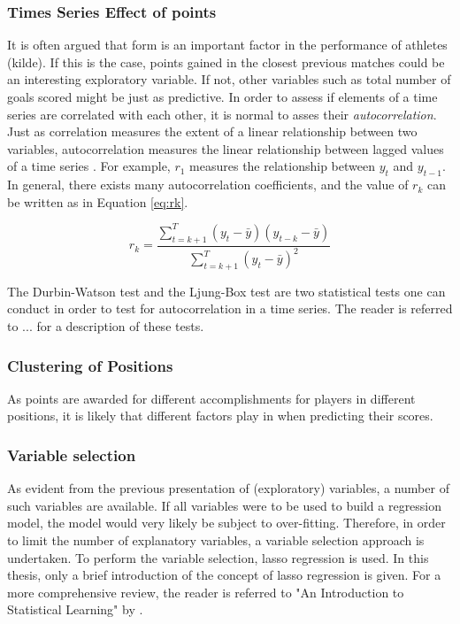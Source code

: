 \subsubsection{Times Series Effect of points}

It is often argued that form is an important factor in the performance of athletes (kilde). If this is the case, points gained in the closest previous matches could be an interesting exploratory variable. If not, other variables such as total number of goals scored might be just as predictive. In order to assess if elements of a time series are correlated with each other, it is normal to asses their \textit{autocorrelation}. Just as correlation measures the extent of a linear relationship between two variables, autocorrelation measures the linear relationship between lagged values of a time series \citep{Hyndman}. For example, $r_1$ measures the relationship between $y_t$ and $y_{t-1}$. In general, there exists many autocorrelation coefficients, and the value of $r_k$ can be written as in Equation \ref{eq:rk}. 


\begin{equation}\label{eq:rk}
    r_k = \frac{\sum_{t=k+1}^T(y_t-\bar{y})(y_{t-k}-\bar{y})}{\sum_{t=k+1}^T(y_t-\bar{y})^2}
\end{equation}

The Durbin-Watson test and the Ljung-Box test are two statistical tests one can conduct in order to test for autocorrelation in a time series. The reader is referred to ... for a description of these tests.

\subsubsection{Clustering of Positions}

As points are awarded for different accomplishments for players in different positions, it is likely that different factors play in when predicting their scores.

\subsubsection{Variable selection}

As evident from the previous presentation of (exploratory) variables, a number of such variables are available. If all variables were to be used to build a regression model, the model would very likely be subject to over-fitting. Therefore, in order to limit the number of explanatory variables, a variable selection approach is undertaken. To perform the variable selection, lasso regression is used. In this thesis, only a brief introduction of the concept of lasso regression is given. For a more comprehensive review, the reader is referred to "An Introduction to Statistical Learning" by \cite{ISLR}.\newpar

